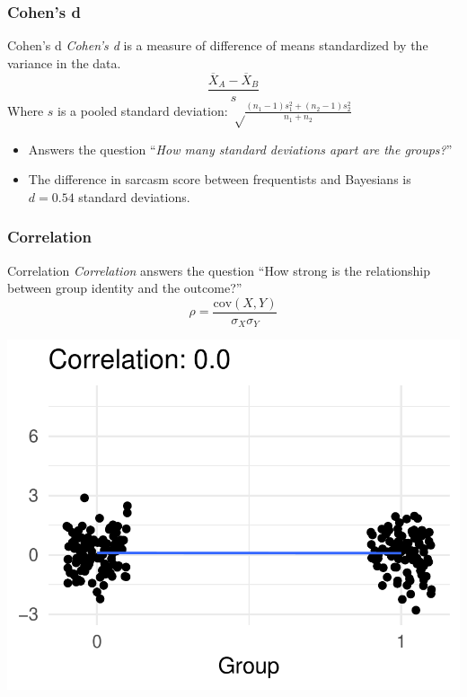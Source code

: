 \documentclass[12pt, block=fill]{beamer}
\newcommand{\cov}{\text{cov}}
\begin{document}
  \begin{frame}
    \frametitle{Cohen's d}

    \begin{block}{Cohen's d}
      \small
    \textit{Cohen's d} is a measure of difference of means
    standardized by the variance in the data.
    \[
      \frac{ \overline{X}_{A} - \overline{X}_{B} }{s}
    \]
    Where $s$ is a pooled standard deviation:
    $\sqrt \frac{(n_1-1)s_1^2 + (n_2-1)s_2^2}{n_1+n_2}$
  \end{block}

  \begin{itemize}
  \item Answers the question ``\textit{How many standard
      deviations apart are the groups?}''
  \item The difference in sarcasm score between frequentists and
    Bayesians is $d = 0.54$ standard deviations.
  \end{itemize}
\end{frame}

\begin{frame}
  \frametitle{Correlation}
  \begin{block}{Correlation}
    \textit{Correlation} answers the question ``How strong is the
    relationship between group identity and the outcome?''
    \[
      \rho = \frac{\cov(X, Y)}{\sigma_{X}\sigma_{Y}}
    \]
  \end{block}

  \begin{center}
    \includegraphics[width = 0.5\linewidth]{./figures/biserial_00}
  \end{center}
\end{frame}
\end{document}
